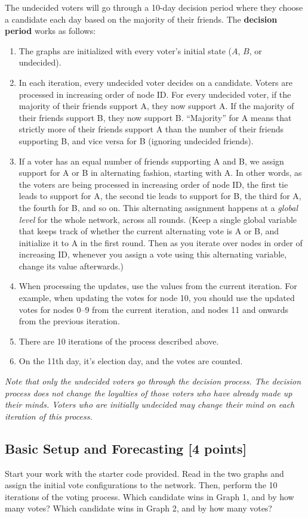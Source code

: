 The undecided voters will go through a 10-day decision period where they choose
a candidate each day based on the majority of their friends. The \textbf{decision period}
works as follows:
\begin{enumerate}
\item The graphs are initialized with every voter's initial state ($A$, $B$, or
  undecided).
\item In each iteration, every undecided voter decides on a candidate.
  Voters are processed in increasing order of node ID.  
  For every undecided voter, if
  the majority of their friends support A, they now support A. If the majority of
  their friends support B, they now support B. ``Majority'' for A means that
  strictly more of their friends support A than the number of their friends supporting B,
  and vice versa for B (ignoring undecided friends).
\item If a voter has an equal number of friends supporting A and B, we assign support
for A or B in alternating fashion, starting with A.  
In other words, as the voters
are being processed in increasing order of node ID, the first tie leads to
support for A, the second tie leads to support for B, the third for A, the fourth for B, and so on.
This alternating assignment happens at a \textit{global level} for the whole network, across all rounds.
(Keep a single global variable that keeps track of whether the current
  alternating vote is A or B, and initialize it to A in the first round. Then as
  you iterate over nodes in order of increasing ID, whenever you assign a vote
  using this alternating variable, change its value afterwards.)
\item When processing the updates, use the values from the current iteration.
  For example, when updating the votes for node 10, you should use the updated
  votes for nodes 0--9 from the current iteration, and nodes 11 and onwards from the
  previous iteration.
\item There are 10 iterations of the process described above.
\item On the 11th day, it's election day, and the votes are counted.
\end{enumerate}

\emph{Note that only the undecided voters go through the decision process. The decision process does not change the loyalties of those voters who have already made up their minds. Voters who are initially undecided may change their mind on each iteration of this process.}

\subsection{Basic Setup and Forecasting [4 points]}
Start your work with the starter code provided.
Read in the two graphs and assign the initial vote configurations to the
network.  Then, perform the 10 iterations of the voting process.  Which candidate wins in
Graph 1, and by how many votes? Which candidate wins in Graph 2, and by how many
votes?

